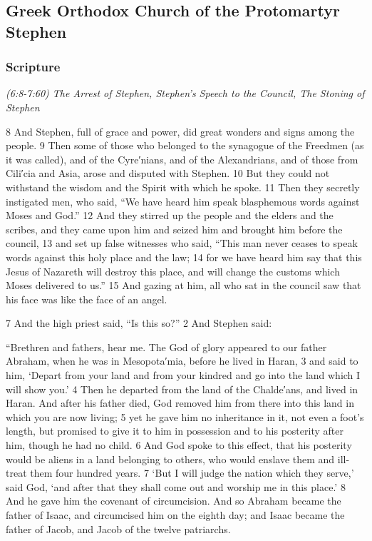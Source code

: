 \documentclass[letterpaper]{report}
\begin{document}
\clearpage
\subsection{Greek Orthodox Church of the Protomartyr Stephen}
\begin{multicols}{2}
	\mbox{}
\end{multicols}
\subsubsection{Scripture}

{\centering
	\emph{(6:8-7:60) The Arrest of Stephen,
		Stephen’s Speech to the Council,
		The Stoning of Stephen}\\
}
\begin{multicols}{2}
8 And Stephen, full of grace and power, did great wonders and signs among the people. 9 Then some of those who belonged to the synagogue of the Freedmen (as it was called), and of the Cyre′nians, and of the Alexandrians, and of those from Cili′cia and Asia, arose and disputed with Stephen. 10 But they could not withstand the wisdom and the Spirit with which he spoke. 11 Then they secretly instigated men, who said, “We have heard him speak blasphemous words against Moses and God.” 12 And they stirred up the people and the elders and the scribes, and they came upon him and seized him and brought him before the council, 13 and set up false witnesses who said, “This man never ceases to speak words against this holy place and the law; 14 for we have heard him say that this Jesus of Nazareth will destroy this place, and will change the customs which Moses delivered to us.” 15 And gazing at him, all who sat in the council saw that his face was like the face of an angel.

7 And the high priest said, “Is this so?” 2 And Stephen said:

“Brethren and fathers, hear me. The God of glory appeared to our father Abraham, when he was in Mesopota′mia, before he lived in Haran, 3 and said to him, ‘Depart from your land and from your kindred and go into the land which I will show you.’ 4 Then he departed from the land of the Chalde′ans, and lived in Haran. And after his father died, God removed him from there into this land in which you are now living; 5 yet he gave him no inheritance in it, not even a foot’s length, but promised to give it to him in possession and to his posterity after him, though he had no child. 6 And God spoke to this effect, that his posterity would be aliens in a land belonging to others, who would enslave them and ill-treat them four hundred years. 7 ‘But I will judge the nation which they serve,’ said God, ‘and after that they shall come out and worship me in this place.’ 8 And he gave him the covenant of circumcision. And so Abraham became the father of Isaac, and circumcised him on the eighth day; and Isaac became the father of Jacob, and Jacob of the twelve patriarchs.


\end{multicols}
\end{document}
